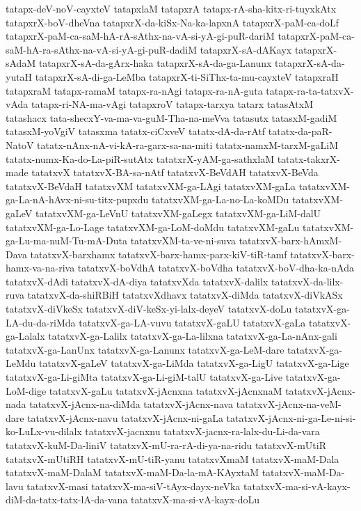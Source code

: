 {tatapx-deV-noV-cayxteV
tatapxlaM
tatapxrA
tatapx-rA-sha-kitx-ri-tuyxkAtx
tatapxrX-boV-dheVna
tatapxrX-da-kiSx-Na-ka-lapxnA
tatapxrX-paM-ca-doLf
tatapxrX-paM-ca-saM-hA-rA-sAthx-na-vA-si-yA-gi-puR-dariM
tatapxrX-paM-ca-saM-hA-ra-sAthx-na-vA-si-yA-gi-puR-dadiM
tatapxrX-sA-dAKayx
tatapxrX-sAdaM
tatapxrX-sA-da-gArx-haka
tatapxrX-sA-da-ga-Lanunx
tatapxrX-sA-da-yutaH
tatapxrX-sA-di-ga-LeMba
tatapxrX-ti-SiThx-ta-mu-cayxteV
tatapxraH
tatapxraM
tatapx-ramaM
tatapx-ra-nAgi
tatapx-ra-nA-guta
tatapx-ra-ta-tatxvX-vAda
tatapx-ri-NA-ma-vAgi
tatapxroV
tatapx-tarxya
tatarx
tatasAtxM
tatashacx
tata-shecxY-va-ma-va-guM-Tha-na-meVva
tatasutx
tatasxM-gadiM
tatasxM-yoVgiV
tatasxma
tatatx-ciCxveV
tatatx-dA-da-rAtf
tatatx-da-paR-NatoV
tatatx-nAnx-nA-vi-kA-ra-garx-sa-na-miti
tatatx-namxM-tarxM-gaLiM
tatatx-numx-Ka-do-La-piR-sutAtx
tatatxrX-yAM-ga-sathxlaM
tatatx-takxrX-made
tatatxvX
tatatxvX-BA-sa-nAtf
tatatxvX-BeVdAH
tatatxvX-BeVda
tatatxvX-BeVdaH
tatatxvXM
tatatxvXM-ga-LAgi
tatatxvXM-gaLa
tatatxvXM-ga-La-nA-hAvx-ni-su-titx-pupxdu
tatatxvXM-ga-La-no-La-koMDu
tatatxvXM-gaLeV
tatatxvXM-ga-LeVnU
tatatxvXM-gaLegx
tatatxvXM-ga-LiM-dalU
tatatxvXM-ga-Lo-Lage
tatatxvXM-ga-LoM-doMdu
tatatxvXM-gaLu
tatatxvXM-ga-Lu-ma-nuM-Tu-mA-Duta
tatatxvXM-ta-ve-ni-suva
tatatxvX-barx-hAmxM-Dava
tatatxvX-barxhamx
tatatxvX-barx-hamx-parx-kiV-tiR-tamf
tatatxvX-barx-hamx-va-na-riva
tatatxvX-boVdhA
tatatxvX-boVdha
tatatxvX-boV-dha-ka-nAda
tatatxvX-dAdi
tatatxvX-dA-diya
tatatxvXda
tatatxvX-dalilx
tatatxvX-da-lilx-ruva
tatatxvX-da-shiRBiH
tatatxvXdhavx
tatatxvX-diMda
tatatxvX-diVkASx
tatatxvX-diVkeSx
tatatxvX-diV-keSx-yi-lalx-deyeV
tatatxvX-doLu
tatatxvX-ga-LA-du-da-riMda
tatatxvX-ga-LA-vuvu
tatatxvX-gaLU
tatatxvX-gaLa
tatatxvX-ga-Lalalx
tatatxvX-ga-Lalilx
tatatxvX-ga-La-lilxna
tatatxvX-ga-La-nAnx-gali
tatatxvX-ga-LanUnx
tatatxvX-ga-Lanunx
tatatxvX-ga-LeM-dare
tatatxvX-ga-LeMdu
tatatxvX-gaLeV
tatatxvX-ga-LiMda
tatatxvX-ga-LigU
tatatxvX-ga-Lige
tatatxvX-ga-Li-giMta
tatatxvX-ga-Li-giM-talU
tatatxvX-ga-Live
tatatxvX-ga-LoM-dige
tatatxvX-gaLu
tatatxvX-jAcnxna
tatatxvX-jAcnxnaM
tatatxvX-jAcnx-nada
tatatxvX-jAcnx-na-diMda
tatatxvX-jAcnx-nava
tatatxvX-jAcnx-na-veM-dare
tatatxvX-jAcnx-navu
tatatxvX-jAcnx-ni-gaLa
tatatxvX-jAcnx-ni-ga-Le-ni-si-ko-LuLx-vu-dilalx
tatatxvX-jacnxnu
tatatxvX-jacnx-ra-lalx-du-Li-da-vara
tatatxvX-kuM-Da-liniV
tatatxvX-mU-ra-rA-di-ya-na-ridu
tatatxvX-mUtiR
tatatxvX-mUtiRH
tatatxvX-mU-tiR-yanu
tatatxvXmaM
tatatxvX-maM-Dala
tatatxvX-maM-DalaM
tatatxvX-maM-Da-la-mA-KAyxtaM
tatatxvX-maM-Da-lavu
tatatxvX-masi
tatatxvX-ma-siV-tAyx-dayx-neVka
tatatxvX-ma-si-vA-kayx-diM-da-tatx-tatx-lA-da-vana
tatatxvX-ma-si-vA-kayx-doLu
}
